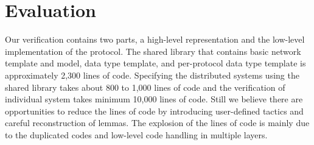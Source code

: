
\section{Evaluation}
\label{chapter:witnesspassing:sec:evaluation}


Our verification contains two parts, a high-level representation and the low-level implementation of the protocol. 
The shared library that contains basic network template and model, 
data type template, and per-protocol data type template is approximately 2,300 lines of code. 
Specifying the distributed systems using the shared library takes about 800 to 1,000 lines of code
and the verification of individual system takes minimum 10,000 lines of code. 
Still we believe there are opportunities to reduce the lines of code by
introducing user-defined tactics and careful reconstruction of lemmas. 
The explosion of the lines of code is mainly due to
the duplicated codes and low-level code handling in multiple layers. 

 